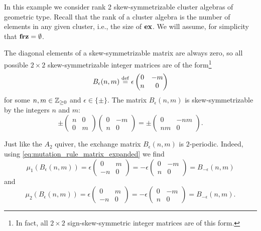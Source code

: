 \begin{example}

	In this example we consider rank 2 skew-symmetrizable cluster algebras of geometric
	type. Recall that the rank of a cluster algebra is the number of elements in any given
	cluster, i.e., the size of $\mathbf{ex}$. We will assume, for simplicity that $\mathbf{frz} =
		\emptyset$.

	The diagonal elements of a skew-symmetrizable matrix are always zero, so all possible
	$2\times2$ skew-symmetrizable integer matrices are of the form\footnote{In fact, all
		$2\times 2$ sign-skew-symmetric integer matrices are of this form.}
	\begin{equation*}
		B_\epsilon(n,m) \overset{\mathrm{def}}{=} \epsilon\begin{pmatrix}
			0 & -m \\
			n & 0
		\end{pmatrix}
	\end{equation*}
	for some $n,m \in \mathbb{Z}_{\geq 0}$ and $\epsilon \in \{\pm\}$. The matrix $B_\epsilon(n,
		m)$ is skew-symmetrizable by the integers $n$ and $m$:
	\begin{equation*}
		\pm
		\begin{pmatrix}
			n & 0 \\
			0 & m
		\end{pmatrix}
		\begin{pmatrix}
			0 & -m \\
			n & 0
		\end{pmatrix}
		= \pm \begin{pmatrix}
			0  & -nm \\
			nm & 0
		\end{pmatrix}.
	\end{equation*}

	Just like the $A_2$ quiver, the exchange matrix $B_\epsilon(n,m)$ is $2$-periodic.
	Indeed, using \cref{eq:mutation_rule_matrix_expanded} we find
	\begin{equation*}
		\mu_1(B_\epsilon(n,m)) = \epsilon\begin{pmatrix}
			0  & m \\
			-n & 0
		\end{pmatrix}
		= -\epsilon \begin{pmatrix}
			0 & -m \\
			n & 0
		\end{pmatrix}
		= B_{-\epsilon}(n, m)
	\end{equation*}
	and
	\begin{equation*}
		\mu_2(B_\epsilon(n,m)) = \epsilon\begin{pmatrix}
			0  & m \\
			-n & 0
		\end{pmatrix}
		= -\epsilon \begin{pmatrix}
			0 & -m \\
			n & 0
		\end{pmatrix}
		=  B_{-\epsilon}(n,m).
	\end{equation*}


\end{example}
